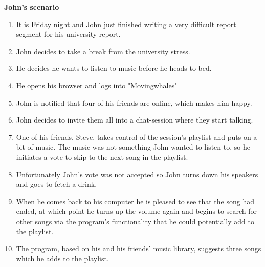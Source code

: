 \vspace{5 mm}
\textbf{John's scenario}
\begin{enumerate}
	\item It is Friday night and John just finished writing a very difficult report segment for his university report.
	\item John decides to take a break from the university stress.
	\item He decides he wants to listen to music before he heads to bed.
	\item He opens his browser and logs into "Movingwhales" 
	\item John is notified that four of his friends are online, which makes him happy.
	\item John decides to invite them all into a chat-session where they start talking.
	\item One of his friends, Steve, takes control of the session's playlist and puts on a bit of music. The music was not something John wanted to listen to, so he initiates a vote to skip to the next song in the playlist.
	\item Unfortunately John's vote was not accepted so John turns down his speakers and goes to fetch a drink.
	\item When he comes back to his computer he is pleased to see that the song had ended, at which point he turns up the volume again and begins to search for other songs via the program's functionality that he could potentially add to the playlist.
	\item The program, based on his and his friends' music library, suggests three songs which he adds to the playlist.

\end{enumerate}